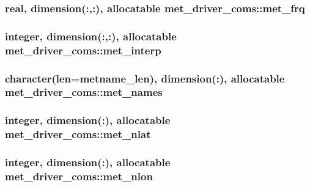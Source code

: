 \subsubsection[{met\+\_\+frq}]{\setlength{\rightskip}{0pt plus 5cm}real, dimension(\+:,\+:), allocatable met\+\_\+driver\+\_\+coms\+::met\+\_\+frq}\label{namespacemet__driver__coms_ab40b47c4228b3048c656a3c9b6040a16}
\hypertarget{namespacemet__driver__coms_a191cf5c1e76eb2c2a3327598a5edcd8a}{}
\subsubsection[{met\+\_\+interp}]{\setlength{\rightskip}{0pt plus 5cm}integer, dimension(\+:,\+:), allocatable met\+\_\+driver\+\_\+coms\+::met\+\_\+interp}\label{namespacemet__driver__coms_a191cf5c1e76eb2c2a3327598a5edcd8a}
\hypertarget{namespacemet__driver__coms_ad156536306a276f36f80dcdaa8cc5858}{}
\subsubsection[{met\+\_\+names}]{\setlength{\rightskip}{0pt plus 5cm}character(len={\bf metname\+\_\+len}), dimension(\+:), allocatable met\+\_\+driver\+\_\+coms\+::met\+\_\+names}\label{namespacemet__driver__coms_ad156536306a276f36f80dcdaa8cc5858}
\hypertarget{namespacemet__driver__coms_a6e01457f55b0c5e2a590116d6ce16ee0}{}
\subsubsection[{met\+\_\+nlat}]{\setlength{\rightskip}{0pt plus 5cm}integer, dimension(\+:), allocatable met\+\_\+driver\+\_\+coms\+::met\+\_\+nlat}\label{namespacemet__driver__coms_a6e01457f55b0c5e2a590116d6ce16ee0}
\hypertarget{namespacemet__driver__coms_aff461244978aff6f00517c80972b0f23}{}
\subsubsection[{met\+\_\+nlon}]{\setlength{\rightskip}{0pt plus 5cm}integer, dimension(\+:), allocatable met\+\_\+driver\+\_\+coms\+::met\+\_\+nlon}\label{namespacemet__driver__coms_aff461244978aff6f00517c80972b0f23}
\hypertarget{namespacemet__driver__coms_ad177e131d2e207ace5152559e6a81e50}{}
